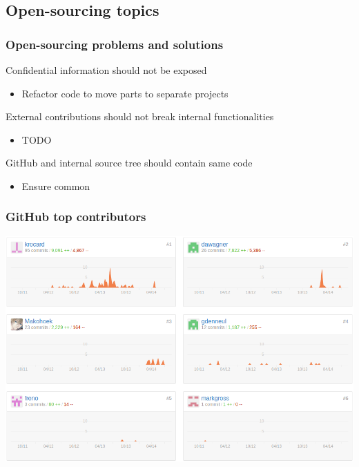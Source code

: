 \subsection{Open-sourcing topics}
\begin{frame}
    \frametitle{Open-sourcing problems and solutions}
    \begin{block}{Confidential information should not be exposed}
        \begin{itemize}
            \item Refactor code to move parts to separate projects
        \end{itemize}
    \end{block}
    \begin{block}{External contributions should not break internal functionalities}
        \begin{itemize}
            \item TODO
        \end{itemize}
    \end{block}
    \begin{block}{GitHub and internal source tree should contain same code}
        \begin{itemize}
            \item Ensure common
        \end{itemize}
    \end{block}
\end{frame}

\begin{frame}
    \frametitle{GitHub top contributors}
    \centering
    \includegraphics[width=\textwidth]{../../report/src/img/statsGitHub.png}
\end{frame}

